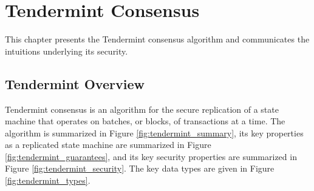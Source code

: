 \chapter{Tendermint Consensus}
\label{ch:tendermint}

This chapter presents the Tendermint consensus algorithm and communicates the intuitions underlying its security.

\section{Tendermint Overview}

Tendermint consensus is an algorithm for the secure replication of a state
machine that operates on batches, or blocks, of transactions at a time.
The algorithm is summarized in Figure \ref{fig:tendermint_summary}, 
its key properties as a replicated state machine are summarized in Figure \ref{fig:tendermint_guarantees}, 
and its key security properties are summarized in Figure \ref{fig:tendermint_security}.
The key data types are given in Figure \ref{fig:tendermint_types}.

